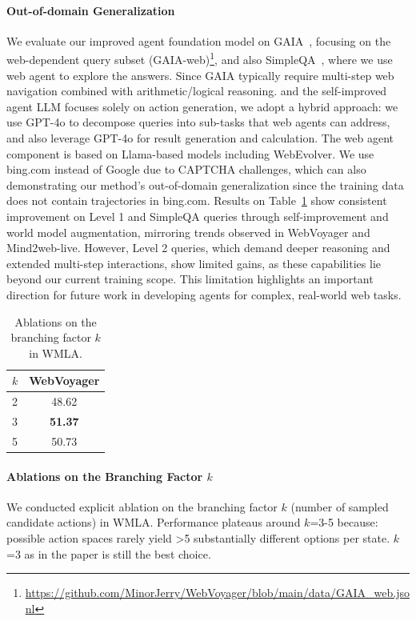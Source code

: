 \documentclass[11pt]{article}
\begin{document}
\paragraph{Out-of-domain Generalization}
We evaluate our improved agent foundation model on GAIA~\citep{GAIA}, focusing on the web-dependent query subset (GAIA-web)\footnote{\url{https://github.com/MinorJerry/WebVoyager/blob/main/data/GAIA_web.jsonl}}, and also SimpleQA~\cite{simpleqa}, where we use web agent to explore the answers.
Since GAIA typically require multi-step web navigation combined with arithmetic/logical reasoning. 
and the self-improved agent LLM focuses solely on action generation, we adopt a hybrid approach: we use GPT-4o to decompose queries into sub-tasks that web agents can address, and also leverage GPT-4o for result generation and calculation. 
The web agent component is based on Llama-based models including WebEvolver.
We use bing.com instead of Google due to CAPTCHA challenges, which can also demonstrating our method's out-of-domain generalization since the training data does not contain trajectories in bing.com. 
Results on Table~\ref{tab:gaia_web} show consistent improvement on Level 1 and SimpleQA queries through self-improvement and world model augmentation, mirroring trends observed in WebVoyager and Mind2web-live. 
However, Level 2 queries, which demand deeper reasoning and extended multi-step interactions, show limited gains, as these capabilities lie beyond our current training scope. 
This limitation highlights an important direction for future work in developing agents for complex, real-world web tasks.

\begin{table}[h]
\centering
\small
\begin{tabular}{lc}
\toprule
$k$ & WebVoyager \\
\midrule
2 & 48.62 \\
3 & \textbf{51.37} \\
5 & 50.73 \\
\bottomrule
\end{tabular}
\caption{Ablations on the branching factor $k$ in WMLA.}
\label{tab:gaia_web}
\end{table}

\paragraph{Ablations on the Branching Factor $k$} We conducted explicit ablation on the branching factor $k$ (number of sampled candidate actions) in WMLA. Performance plateaus around $k$=3-5 because: possible action spaces rarely yield >5 substantially different options per state. $k$=3 as in the paper is still the best choice.
\end{document}
